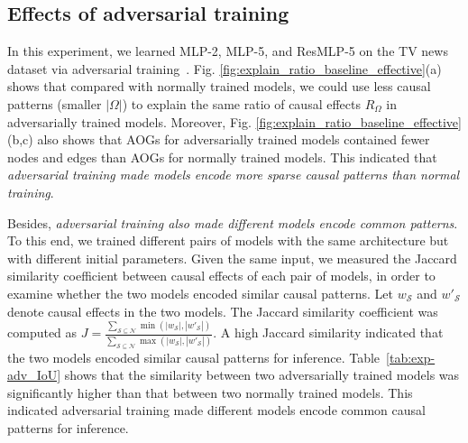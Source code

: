 \documentclass[10pt,twocolumn,letterpaper]{article}
\begin{document}
\subsection{Effects of adversarial training}
\label{subsec:exp-adv-train}

In this experiment, we learned MLP-2, MLP-5, and ResMLP-5 on the TV news dataset via adversarial training~\cite{madry2018towards}.
Fig. \ref{fig:explain_ratio_baseline_effective}(a) shows that compared with normally trained models, we could use less causal patterns (smaller {\small$|\Omega|$}) to explain the same ratio of causal effects {\small$R_\Omega$} in adversarially trained models.
Moreover, Fig. \ref{fig:explain_ratio_baseline_effective}(b,c) also shows that AOGs for adversarially trained models contained fewer nodes and edges than AOGs for normally trained models.
This indicated that \textit{adversarial training made models encode more sparse causal patterns than normal training}.


Besides, \textit{adversarial training also made different models encode common patterns}.
To this end, we trained different pairs of models with the same architecture but with different initial parameters.
Given the same input, we measured the Jaccard similarity coefficient between causal effects of each pair of models, in order to examine whether the two models encoded similar causal patterns.
Let {\small$w_{\mathcal{S}}$} and {\small$w'_{\mathcal{S}}$} denote causal effects in the two models.
The Jaccard similarity coefficient
was computed as 
{\small $J\!=\!\frac{\sum_{\mathcal{S}\subseteq \mathcal{N}}\min(|w_{\mathcal{S}}|, |w'_{\mathcal{S}}|)}{\sum_{\mathcal{S}\subseteq \mathcal{N}}\max(|w_{\mathcal{S}}|, |w'_{\mathcal{S}}|)}$}.
A high Jaccard similarity indicated that the two models encoded similar causal patterns for inference.
Table~\ref{tab:exp-adv_IoU} shows that the similarity between two adversarially trained models was significantly higher than that between two normally trained models.
This indicated adversarial training made different models encode common causal patterns for inference.
\end{document}
